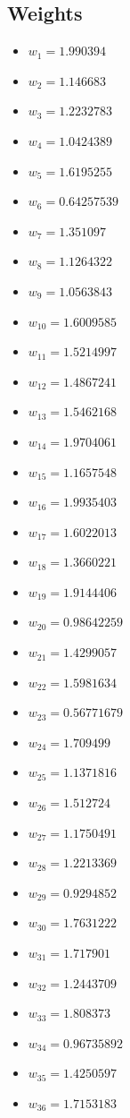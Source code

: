 \documentclass[11pt]{article}
\begin{document}
\subsection*{Weights}
\begin{itemize}
\item $w_{1} = 1.990394$
\item $w_{2} = 1.146683$
\item $w_{3} = 1.2232783$
\item $w_{4} = 1.0424389$
\item $w_{5} = 1.6195255$
\item $w_{6} = 0.64257539$
\item $w_{7} = 1.351097$
\item $w_{8} = 1.1264322$
\item $w_{9} = 1.0563843$
\item $w_{10} = 1.6009585$
\item $w_{11} = 1.5214997$
\item $w_{12} = 1.4867241$
\item $w_{13} = 1.5462168$
\item $w_{14} = 1.9704061$
\item $w_{15} = 1.1657548$
\item $w_{16} = 1.9935403$
\item $w_{17} = 1.6022013$
\item $w_{18} = 1.3660221$
\item $w_{19} = 1.9144406$
\item $w_{20} = 0.98642259$
\item $w_{21} = 1.4299057$
\item $w_{22} = 1.5981634$
\item $w_{23} = 0.56771679$
\item $w_{24} = 1.709499$
\item $w_{25} = 1.1371816$
\item $w_{26} = 1.512724$
\item $w_{27} = 1.1750491$
\item $w_{28} = 1.2213369$
\item $w_{29} = 0.9294852$
\item $w_{30} = 1.7631222$
\item $w_{31} = 1.717901$
\item $w_{32} = 1.2443709$
\item $w_{33} = 1.808373$
\item $w_{34} = 0.96735892$
\item $w_{35} = 1.4250597$
\item $w_{36} = 1.7153183$

\end{itemize}
\end{document}
